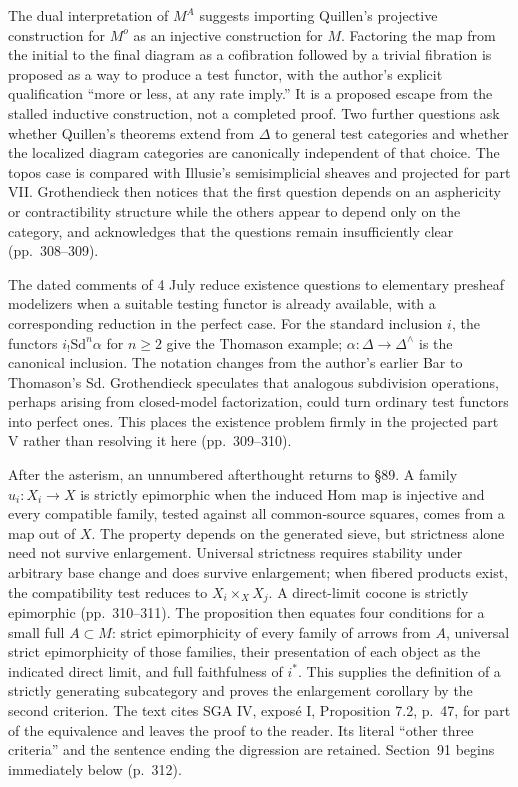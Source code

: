 The dual interpretation of $M^A$ suggests importing Quillen's projective construction for $M^o$ as an injective construction for $M$. Factoring the map from the initial to the final diagram as a cofibration followed by a trivial fibration is proposed as a way to produce a test functor, with the author's explicit qualification “more or less, at any rate imply.” It is a proposed escape from the stalled inductive construction, not a completed proof. Two further questions ask whether Quillen's theorems extend from $\Delta$ to general test categories and whether the localized diagram categories are canonically independent of that choice. The topos case is compared with Illusie's semisimplicial sheaves and projected for part VII. Grothendieck then notices that the first question depends on an asphericity or contractibility structure while the others appear to depend only on the category, and acknowledges that the questions remain insufficiently clear (pp.\ 308--309).

The dated comments of 4 July reduce existence questions to elementary presheaf modelizers when a suitable testing functor is already available, with a corresponding reduction in the perfect case. For the standard inclusion $i$, the functors $i_!\mathrm{Sd}^n\alpha$ for $n\geq2$ give the Thomason example; $\alpha:\Delta\to\Delta^\wedge$ is the canonical inclusion. The notation changes from the author's earlier Bar to Thomason's Sd. Grothendieck speculates that analogous subdivision operations, perhaps arising from closed-model factorization, could turn ordinary test functors into perfect ones. This places the existence problem firmly in the projected part V rather than resolving it here (pp.\ 309--310).

After the asterism, an unnumbered afterthought returns to \S89. A family $u_i:X_i\to X$ is strictly epimorphic when the induced Hom map is injective and every compatible family, tested against all common-source squares, comes from a map out of $X$. The property depends on the generated sieve, but strictness alone need not survive enlargement. Universal strictness requires stability under arbitrary base change and does survive enlargement; when fibered products exist, the compatibility test reduces to $X_i\times_X X_j$. A direct-limit cocone is strictly epimorphic (pp.\ 310--311). The proposition then equates four conditions for a small full $A\subset M$: strict epimorphicity of every family of arrows from $A$, universal strict epimorphicity of those families, their presentation of each object as the indicated direct limit, and full faithfulness of $i^*$. This supplies the definition of a strictly generating subcategory and proves the enlargement corollary by the second criterion. The text cites SGA IV, expos\'e I, Proposition 7.2, p.\ 47, for part of the equivalence and leaves the proof to the reader. Its literal “other three criteria” and the sentence ending the digression are retained. Section~91 begins immediately below (p.\ 312).

